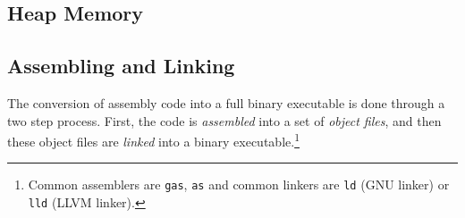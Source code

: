 \subsection{Heap Memory}

\subsection{Assembling and Linking}

  The conversion of assembly code into a full binary executable is done through a two step process. First, the code is \textit{assembled} into a set of \textit{object files}, and then these object files are \textit{linked} into a binary executable.\footnote{Common assemblers are \texttt{gas}, \texttt{as} and common linkers are \texttt{ld} (GNU linker) or \texttt{lld} (LLVM linker).}

